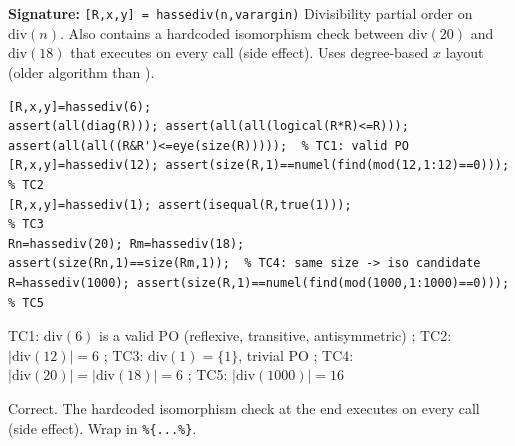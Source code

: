 \chapter{}
\begin{tcolorbox}[Abox,title={Analysis}]
\textbf{Signature:} \lstinline|[R,x,y] = hassediv(n,varargin)|\quad
Divisibility partial order on $\mathrm{div}(n)$. Also contains a hardcoded isomorphism check between $\mathrm{div}(20)$ and $\mathrm{div}(18)$ that executes on every call (side effect). Uses degree-based $x$ layout (older algorithm than ).
\end{tcolorbox}
\begin{lstlisting}[caption={Tests for hassediv.m}]
[R,x,y]=hassediv(6);
assert(all(diag(R))); assert(all(all(logical(R*R)<=R)));
assert(all(all((R&R')<=eye(size(R)))));  % TC1: valid PO
[R,x,y]=hassediv(12); assert(size(R,1)==numel(find(mod(12,1:12)==0))); % TC2
[R,x,y]=hassediv(1); assert(isequal(R,true(1)));                       % TC3
Rn=hassediv(20); Rm=hassediv(18);
assert(size(Rn,1)==size(Rm,1));  % TC4: same size -> iso candidate
R=hassediv(1000); assert(size(R,1)==numel(find(mod(1000,1:1000)==0))); % TC5
\end{lstlisting}
\begin{tcolorbox}[Pbox,title={TC1--TC5 -- All pass}]
TC1: $\mathrm{div}(6)$ is a valid PO (reflexive, transitive, antisymmetric) \APROVADO; TC2: $|\mathrm{div}(12)|=6$ \APROVADO; TC3: $\mathrm{div}(1)=\{1\}$, trivial PO \APROVADO; TC4: $|\mathrm{div}(20)|=|\mathrm{div}(18)|=6$ \APROVADO; TC5: $|\mathrm{div}(1000)|=16$ \APROVADO
\end{tcolorbox}
\begin{concl}
Correct. The hardcoded isomorphism check at the end executes on every call (side effect). Wrap in \lstinline|%{...%}|.
\end{concl}

